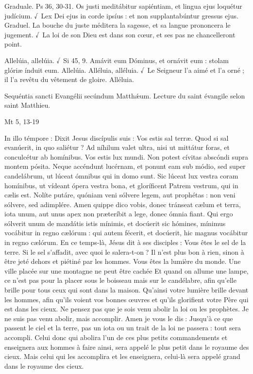 \begin{paracol}{2}
Graduale. Ps 36, 30-31. Os justi meditábitur sapiéntiam, et lingua ejus loquétur judícium. √~Lex Dei ejus  in corde ipsíus : et non supplantabúntur gressus ejus.
\switchcolumn
Graduel. La bouche du juste méditera la sagesse, et sa langue prononcera le jugement. √~La loi de son Dieu est dans son cœur, et ses pas ne chancelleront point.
\switchcolumn*

Allelúia, allelúia. √~Si 45, 9. Amávit eum Dóminus, et ornávit eum : stolam glóriæ índuit eum. Allelúia.
\switchcolumn
Alléluia, alléluia. √~Le Seigneur l’a aimé et l’a orné ; il l’a revêtu du vêtement de gloire. Alléluia.
\switchcolumn*

Sequéntia sancti Evangélii secúndum Matthǽum.
\switchcolumn
Lecture du saint évangile selon saint Matthieu.
\switchcolumn*

Mt 5, 13-19
\switchcolumn

\switchcolumn*

In illo témpore : Dixit Jesus discípulis  suis : Vos estis sal terræ. Quod si sal evanúerit, in quo saliétur ? Ad níhilum valet ultra, nisi ut mittátur foras, et conculcétur ab homínibus. Vos estis lux mundi. Non potest cívitas abscóndi supra montem pósita. Neque accéndunt lucérnam, et ponunt eam sub módio, sed super candelábrum, ut lúceat ómnibus qui in domo sunt. Sic lúceat lux vestra coram homínibus, ut vídeant ópera vestra bona, et gloríficent Patrem vestrum, qui in cælis est. Nolíte putáre, quóniam veni sólvere legem, aut prophétas : non veni sólvere, sed adimplére. Amen quippe dico vobis, donec tránseat cælum et terra, iota unum, aut unus apex non præteríbit a lege, donec ómnia fiant. Qui ergo sólverit unum de mandátis istis mínimis, et docúerit sic hómines, mínimus vocábitur in regno cælórum : qui autem fécerit, et docúerit, hic magnus vocábitur in regno cælórum.
\switchcolumn
En ce temps-là, Jésus dit à ses disciples :  Vous êtes le sel de la terre. Si le sel s’affadit, avec quoi le salera-t-on ? Il n’est plus bon à rien, sinon à être jeté dehors et piétiné par les hommes. Vous êtes la lumière du monde. Une ville placée sur une montagne ne peut être cachée Et quand on allume une lampe, ce n’est pas pour la placer sous le boisseau mais sur le candélabre, afin qu’elle brille pour tous ceux qui sont dans la maison. Qu’ainsi votre lumière brille devant les hommes, afin qu’ils voient vos bonnes œuvres et qu’ils glorifient votre Père qui est dans les cieux. Ne pensez pas que je sois venu abolir la loi ou les prophètes. Je ne suis pas venu abolir, mais accomplir. Amen je vous le dis : Jusqu’à ce que passent le ciel et la terre, pas un iota ou un trait de la loi ne passera : tout sera accompli. Celui donc qui abolira l’un de ces plus petits commandements et enseignera aux hommes à faire ainsi, sera appelé le plus petit dans le royaume des cieux. Mais celui qui les accomplira et les enseignera, celui-là sera appelé grand dans le royaume des cieux.
\switchcolumn*


\end{paracol}
